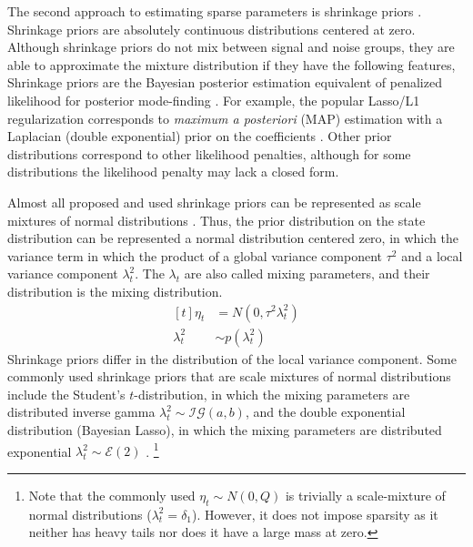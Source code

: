 \documentclass{article}
\newcommand{\dist}[1]{\mathcal{#1}}
\newcommand{\paren}[1]{\ensuremath{\left(#1\right)}}
\newcommand{\dinvgamma}[1]{\ensuremath{\dist{IG}\paren{#1}}}
\newcommand{\dexp}[1]{\ensuremath{\dist{E}\paren{#1}}}
\begin{document}
The second approach to estimating sparse parameters is shrinkage priors \parencites{Tibshirani1996}{Tipping2001}.
Shrinkage priors are absolutely continuous distributions centered at zero.
Although shrinkage priors do not mix between signal and noise groups, they are able to approximate the mixture distribution if they have the following features,
Shrinkage priors are the Bayesian posterior estimation equivalent of penalized likelihood for posterior mode-finding \parencites{PolsonScott2010}{PolsonScott2012a}.
For example, the popular Lasso/L1 regularization \parencite{Tibshirani1996} corresponds to \textit{maximum a posteriori} (MAP) estimation with a Laplacian (double exponential) prior on the coefficients \parencites{ParkCasella2008}{Hans2009}.
Other prior distributions correspond to other likelihood penalties, although for some distributions the likelihood penalty may lack a closed form.

Almost all proposed and used shrinkage priors can be represented as scale mixtures of normal distributions \parencite{PolsonScott2010}.
Thus, the prior distribution on the state distribution can be represented a normal distribution centered zero, in which the variance term in which the product of a global variance component $\tau^{2}$ and a local variance component $\lambda_{t}^{2}$.
The $\lambda_t$ are also called mixing parameters, and their distribution is the mixing distribution.
\begin{equation}
  \label{eq:3}
  \begin{aligned}[t]
    \eta_{t} &= N(0, \tau^{2} \lambda_{t}^{2}) \\
    \lambda_{t}^{2} &\sim p(\lambda_{t}^{2})
  \end{aligned}
\end{equation}
Shrinkage priors differ in the distribution of the local variance component.%
Some commonly used shrinkage priors that are scale mixtures of normal distributions include the Student's $t$-distribution, in which the mixing parameters are distributed inverse gamma $\lambda^{2}_{t} \sim \dinvgamma{a, b}$, and the double exponential distribution (Bayesian Lasso), in which the mixing parameters are distributed exponential $\lambda^{2}_{t} \sim \dexp{2}$ \parencite[74]{CarvalhoPolsonScott2009}.
\footnote{
Note that the commonly used $\eta_{t} \sim N(0, Q)$ is trivially a scale-mixture of normal distributions ($\lambda_{t}^{2} = \delta_{1}$).
However, it does not impose sparsity as it neither has heavy tails nor does it have a large mass at zero.
}
\end{document}
